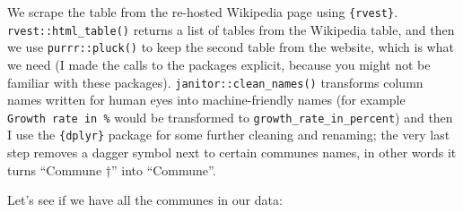 \documentclass[
  letterpaper,
  DIV=11,
  numbers=noendperiod]{scrartcl}
\newenvironment{Shaded}{\begin{snugshade}}{\end{snugshade}}
\newcommand{\AttributeTok}[1]{\textcolor[rgb]{0.40,0.45,0.13}{#1}}
\newcommand{\DecValTok}[1]{\textcolor[rgb]{0.68,0.00,0.00}{#1}}
\newcommand{\FunctionTok}[1]{\textcolor[rgb]{0.28,0.35,0.67}{#1}}
\newcommand{\NormalTok}[1]{\textcolor[rgb]{0.00,0.23,0.31}{#1}}
\newcommand{\OtherTok}[1]{\textcolor[rgb]{0.00,0.23,0.31}{#1}}
\newcommand{\SpecialCharTok}[1]{\textcolor[rgb]{0.37,0.37,0.37}{#1}}
\newcommand{\StringTok}[1]{\textcolor[rgb]{0.13,0.47,0.30}{#1}}
\begin{document}
\begin{Shaded}
\end{Shaded}

We scrape the table from the re-hosted Wikipedia page using
\texttt{\{rvest\}}. \texttt{rvest::html\_table()} returns a list of
tables from the Wikipedia table, and then we use \texttt{purrr::pluck()}
to keep the second table from the website, which is what we need (I made
the calls to the packages explicit, because you might not be familiar
with these packages). \texttt{janitor::clean\_names()} transforms column
names written for human eyes into machine-friendly names (for example
\texttt{Growth\ rate\ in\ \%} would be transformed to
\texttt{growth\_rate\_in\_percent}) and then I use the
\texttt{\{dplyr\}} package for some further cleaning and renaming; the
very last step removes a dagger symbol next to certain communes names,
in other words it turns ``Commune †'' into ``Commune''.

Let's see if we have all the communes in our data:

\begin{Shaded}
\end{Shaded}
\end{document}
